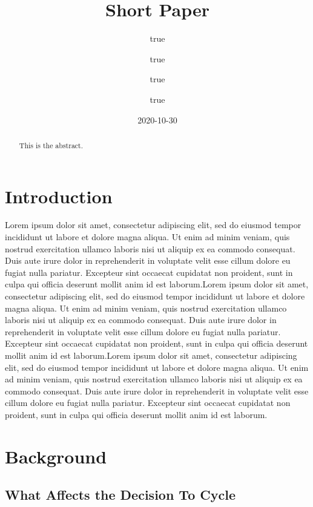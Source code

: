 \documentclass[
]{article}
\title{Short Paper}
\author{true \and true \and true \and true}
\date{2020-10-30}
\begin{document}
\maketitle
\begin{abstract}
This is the abstract.
\end{abstract}

\hypertarget{introduction}{%
\section{Introduction}\label{introduction}}

Lorem ipsum dolor sit amet, consectetur adipiscing elit, sed do eiusmod
tempor incididunt ut labore et dolore magna aliqua. Ut enim ad minim
veniam, quis nostrud exercitation ullamco laboris nisi ut aliquip ex ea
commodo consequat. Duis aute irure dolor in reprehenderit in voluptate
velit esse cillum dolore eu fugiat nulla pariatur. Excepteur sint
occaecat cupidatat non proident, sunt in culpa qui officia deserunt
mollit anim id est laborum.Lorem ipsum dolor sit amet, consectetur
adipiscing elit, sed do eiusmod tempor incididunt ut labore et dolore
magna aliqua. Ut enim ad minim veniam, quis nostrud exercitation ullamco
laboris nisi ut aliquip ex ea commodo consequat. Duis aute irure dolor
in reprehenderit in voluptate velit esse cillum dolore eu fugiat nulla
pariatur. Excepteur sint occaecat cupidatat non proident, sunt in culpa
qui officia deserunt mollit anim id est laborum.Lorem ipsum dolor sit
amet, consectetur adipiscing elit, sed do eiusmod tempor incididunt ut
labore et dolore magna aliqua. Ut enim ad minim veniam, quis nostrud
exercitation ullamco laboris nisi ut aliquip ex ea commodo consequat.
Duis aute irure dolor in reprehenderit in voluptate velit esse cillum
dolore eu fugiat nulla pariatur. Excepteur sint occaecat cupidatat non
proident, sunt in culpa qui officia deserunt mollit anim id est laborum.

\hypertarget{background}{%
\section{Background}\label{background}}

\hypertarget{what-affects-the-decision-to-cycle}{%
\subsection{What Affects the Decision To
Cycle}\label{what-affects-the-decision-to-cycle}}
\end{document}
